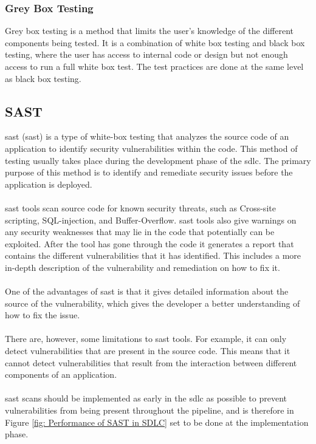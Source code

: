\subsubsection{Grey Box Testing}
Grey box testing is a method that limits the user's knowledge of the different components being tested. It is a combination of white box testing and black box testing, where the user has access to internal code or design but not enough access to run a full white box test. The test practices are done at the same level as black box testing. \cite{GreyBox}


\subsection{SAST}
\acrlong{sast} (\acrshort{sast}) is a type of white-box testing that analyzes the source code of an application to identify security vulnerabilities within the code. This method of testing usually takes place during the development phase of the \acrlong{sdlc}. The primary purpose of this method is to identify and remediate security issues before the application is deployed. \cite{sast}
\\~\\
\acrshort{sast} tools scan source code for known security threats, such as \gls{Cross-site scripting}, \gls{SQL-injection}, and \gls{Buffer-Overflow}. \acrshort{sast} tools also give warnings on any security weaknesses that may lie in the code that potentially can be exploited. After the tool has gone through the code it generates a report that contains the different vulnerabilities that it has identified. This includes a more in-depth description of the vulnerability and remediation on how to fix it. \
\\~\\
One of the advantages of \acrshort{sast} is that it gives detailed information about the source of the vulnerability, which gives the developer a better understanding of how to fix the issue. 
\\~\\
There are, however, some limitations to \acrshort{sast} tools. For example, it can only detect vulnerabilities that are present in the source code. This means that it cannot detect vulnerabilities that result from the interaction between different components of an application.
\\~\\
\acrshort{sast} scans should be implemented as early in the \acrshort{sdlc} as possible to prevent vulnerabilities from being present throughout the pipeline, and is therefore in Figure \ref{fig: Performance of SAST in SDLC} set to be done at the implementation phase.  
